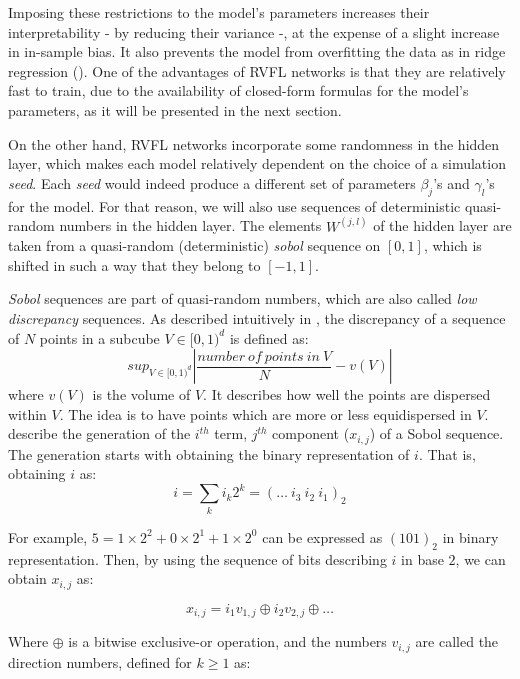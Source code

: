 \medskip

Imposing these restrictions to the model's parameters increases their interpretability - by reducing their variance -, at the expense of a slight increase in in-sample bias. It also prevents the model from overfitting the data as in ridge regression (\cite{hoerl1970ridge}). One of the advantages of RVFL networks is that they are relatively fast to train, due to the availability of closed-form formulas for the model's parameters, as it will be presented in the next section.

\medskip

On the other hand, RVFL networks incorporate some randomness in the hidden layer, which makes each model relatively dependent on the choice of a simulation \textit{seed}. Each \textit{seed} would indeed produce a different set of parameters $\beta_j$'s and $\gamma_l$'s for the model. For that reason, we will also use sequences of deterministic quasi-random numbers in the hidden layer. The elements $W^{(j, l)}$ of the hidden layer are taken from a quasi-random (deterministic) \textit{sobol} sequence on $[0, 1]$, which is shifted in such a way that they belong to $[-1, 1]$.

\medskip

\textit{Sobol} sequences are part of quasi-random numbers, which are also called \textit{low discrepancy} sequences. As described intuitively in \cite{boyle1997quasi}, the discrepancy of a sequence of $N$ points in a subcube $V \in [0, 1)^d$ is defined as:
$$
sup_{V \in [0, 1)^d} |\frac{number \: of \: points \: in \: V}{N} - v(V)|
$$
where $v(V)$ is the volume of $V$. It describes how well the points are dispersed within $V$. The idea is to have points which are more or less equidispersed in $V$. \cite{joe2008sobol} describe the generation of the $i^{th}$ term, $j^{th}$ component ($x_{i, j}$) of a Sobol sequence. The generation starts with obtaining the binary representation of $i$. That is, obtaining $i$ as:
$$
i = \sum_k i_k 2^k = ( \ldots \: i_3 \: i_2 \: i_1)_2
$$

For example, $5 = 1 \times 2^2 + 0 \times 2^1 + 1 \times 2^0$ can be expressed as $(101)_2$ in binary representation. Then, by using the sequence of bits describing $i$ in base $2$, we can obtain $x_{i, j}$ as: 

\begin{equation}
\label{ithjthsobol}
x_{i, j} = i_1 v_{1, j} \oplus i_2 v_{2, j} \oplus \ldots 
\end{equation}

Where $\oplus$ is a bitwise exclusive-or operation, and the numbers $v_{i, j}$ are called the direction numbers, defined for $k \geq 1$ as: 

